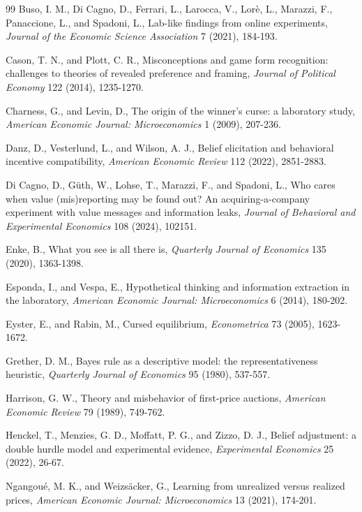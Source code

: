 \documentclass[11pt,a4paper]{article}
\begin{document}
{\begin{thebibliography}{99}
 Buso, I. M., Di Cagno, D., Ferrari, L., Larocca, V., Lor\`e, L., Marazzi, F., Panaccione, L., and Spadoni, L., Lab-like findings from online experiments, \emph{Journal of the Economic Science Association} 7 (2021), 184-193.

 Cason, T. N., and Plott, C. R., Misconceptions and game form recognition: challenges to theories of revealed preference and framing, \emph{Journal of Political Economy} 122 (2014), 1235-1270.

 Charness, G., and Levin, D., The origin of the winner's curse: a laboratory study, \emph{American Economic Journal: Microeconomics} 1 (2009), 207-236.

 Danz, D., Vesterlund, L., and Wilson, A. J., Belief elicitation and behavioral incentive compatibility, \emph{American Economic Review} 112 (2022), 2851-2883.

 Di Cagno, D., G\"uth, W., Lohse, T., Marazzi, F., and Spadoni, L., Who cares when value (mis)reporting may be found out? An acquiring-a-company experiment with value messages and information leaks, \emph{Journal of Behavioral and Experimental Economics} 108 (2024), 102151.

 Enke, B., What you see is all there is, \emph{Quarterly Journal of Economics} 135 (2020), 1363-1398.

 Esponda, I., and Vespa, E., Hypothetical thinking and information extraction in the laboratory, \emph{American Economic Journal: Microeconomics} 6 (2014), 180-202.

 Eyster, E., and Rabin, M., Cursed equilibrium, \emph{Econometrica} 73 (2005), 1623-1672.

 Grether, D. M., Bayes rule as a descriptive model: the representativeness heuristic, \emph{Quarterly Journal of Economics} 95 (1980), 537-557.

 Harrison, G. W., Theory and misbehavior of first-price auctions, \emph{American Economic Review} 79 (1989), 749-762.

 Henckel, T., Menzies, G. D., Moffatt, P. G., and Zizzo, D. J., Belief adjustment: a double hurdle model and experimental evidence, \emph{Experimental Economics} 25 (2022), 26-67.

 Ngangou\'e, M. K., and Weizs\"acker, G., Learning from unrealized versus realized prices, \emph{American Economic Journal: Microeconomics} 13 (2021), 174-201.


\end{thebibliography}}
\end{document}
